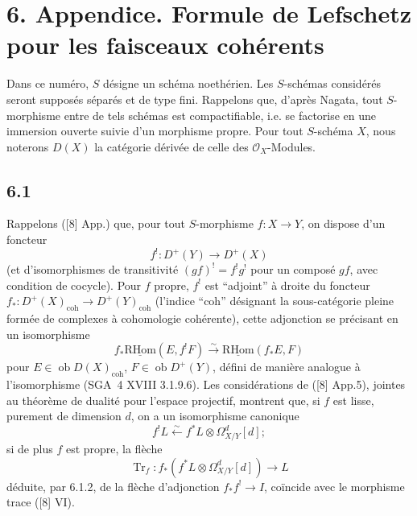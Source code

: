 \documentclass[11pt]{article}
\providecommand{\cO}{\mathcal{O}}
\newcommand{\R}{\mathrm{R}}\newcommand{\RHomCore}{\mathrm{RHom}}
\providecommand{\RHom}{\RHomCore}
\providecommand{\uRHom}{\underline{\RHom}}
\providecommand{\RHom}{\RHomCore}
\providecommand{\RHom}{\R\mathcal{H}om}
\providecommand{\R}{\mathrm R}
\providecommand{\RHom}{\RHomCore}
\begin{document}
\section*{6. Appendice. Formule de Lefschetz pour les faisceaux cohérents}

Dans ce numéro, $S$ désigne un schéma noethérien. Les $S$-schémas considérés seront supposés séparés et de type fini. Rappelons que, d'après Nagata, tout $S$-morphisme entre de tels schémas est compactifiable, i.e. se factorise en une immersion ouverte suivie d'un morphisme propre. Pour tout $S$-schéma $X$, nous noterons $D(X)$ la catégorie dérivée de celle des $\cO_X$-Modules.

\subsection*{6.1}
Rappelons ([8] App.) que, pour tout $S$-morphisme $f:X\to Y$, on dispose d'un foncteur
\[
f^!:D^+(Y)\longrightarrow D^+(X)
\]
(et d'isomorphismes de transitivité $(gf)^! = f^!g^!$ pour un composé $gf$, avec condition de cocycle). Pour $f$ propre, $f^!$ est ``adjoint'' à droite du foncteur $f_*:D^+(X)_{\mathrm{coh}}\to D^+(Y)_{\mathrm{coh}}$ (l'indice ``coh'' désignant la sous-catégorie pleine formée de complexes à cohomologie cohérente), cette adjonction se précisant en un isomorphisme
\begin{equation}
\tag{6.1.1}
f_*\uRHom(E,f^!F)\xrightarrow{\sim}\uRHom(f_*E,F)
\end{equation}
pour $E\in\operatorname{ob}D(X)_{\mathrm{coh}}$, $F\in\operatorname{ob}D^+(Y)$, défini de manière analogue à l'isomorphisme (SGA~4 XVIII 3.1.9.6). Les considérations de ([8] App.5), jointes au théorème de dualité pour l'espace projectif, montrent que, si $f$ est lisse, purement de dimension $d$, on a un isomorphisme canonique
\begin{equation}
\tag{6.1.2}
f^!L\xleftarrow{\sim} f^*L\otimes\Omega^d_{X/Y}[d];
\end{equation}
si de plus $f$ est propre, la flèche
\begin{equation}
\tag{6.1.3}
\operatorname{Tr}_f:f_*(f^*L\otimes\Omega^d_{X/Y}[d])\longrightarrow L
\end{equation}
déduite, par 6.1.2, de la flèche d'adjonction $f_*f^!\to I$, coïncide avec le morphisme trace ([8] VI).
\end{document}
